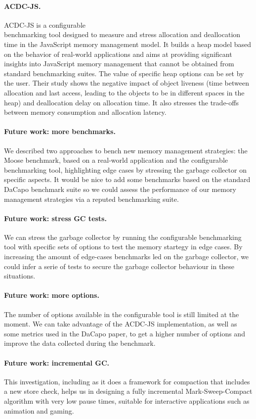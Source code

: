 \documentclass[10pt, sigplan]{acmart}
\begin{document}
\paragraph{ACDC-JS.}
ACDC-JS \cite{ACDCJS} is a configurable \\benchmarking tool designed to measure and stress allocation and deallocation time in the JavaScript memory management model. 
It builds a heap model based on the behavior of real-world applications and aims at providing significant insights into JavaScript memory management that cannot be obtained from standard benchmarking suites. The value of specific heap options can be set by the user. 
Their study shows the negative impact of object liveness (time between allocation and last access, leading to the objects to be in different spaces in the heap) and deallocation delay on allocation time. It also stresses the trade-offs between memory consumption and allocation latency.

\paragraph{Future work: more benchmarks.}
We described two approaches to bench new memory management strategies: the Moose benchmark, based on a real-world application and the configurable benchmarking tool, highlighting edge cases by stressing the garbage collector on specific aspects. It would be nice to add some benchmarks based on the standard DaCapo benchmark suite so we could assess the performance of our memory management strategies via a reputed benchmarking suite.

\paragraph{Future work: stress GC tests.}
We can stress the garbage collector by running the configurable benchmarking tool with specific sets of options to test the memory startegy in edge cases. By increasing the amount of edge-cases benchmarks led on the garbage collector, we could infer a serie of tests to secure the garbage collector behaviour in these situations.

\paragraph{Future work: more options.}
The number of options available in the configurable tool is still limited at the moment. We can take advantage of the ACDC-JS implementation, as well as some metrics used in the DaCapo paper, to get a higher number of options and improve the data collected during the benchmark.

\paragraph{Future work: incremental GC.}
This investigation, including as it does a framework for compaction that includes a new store check, helps us in designing a fully incremental Mark-Sweep-Compact algorithm with very low pause times, suitable for interactive applications such as animation and gaming.



\end{document}
